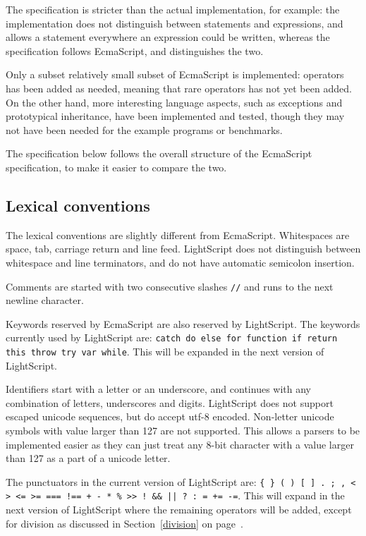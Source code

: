 \documentclass[11pt]{report}
\begin{document}
The specification is stricter than the actual implementation, for example: the implementation does not distinguish between statements and expressions, and allows a statement everywhere an expression could be written, whereas the specification follows EcmaScript, and distinguishes the two.

Only a subset relatively small subset of EcmaScript is implemented: operators has been added as needed, meaning that rare operators has not yet been added. 
On the other hand, more interesting language aspects, such as exceptions and prototypical inheritance, have been implemented and tested, though they may not have been needed for the example programs or benchmarks.

The specification below follows the overall structure of the EcmaScript specification, to make it easier to compare the two.


\subsection{Lexical conventions}
The lexical conventions are slightly different from EcmaScript. 
Whitespaces are space, tab, carriage return and line feed. 
LightScript does not distinguish between whitespace and line terminators, and do not have automatic semicolon insertion.

Comments are started with two consecutive slashes \verb|//| and runs to the next newline character.

Keywords reserved by EcmaScript are also reserved by LightScript. The keywords currently used by LightScript are: {\tt catch do else for function if return this throw try var while}. This will be expanded in the next version of LightScript.

Identifiers start with a letter or an underscore, and continues with any combination of letters, underscores and digits. 
LightScript does not support escaped unicode sequences, but do accept utf-8 encoded. Non-letter unicode symbols with value larger than 127 are not supported. This allows a parsers to be implemented easier as they can just treat any 8-bit character with a value larger than 127 as a part of a unicode letter.

The punctuators in the current version of LightScript are: {\tt \verb|{| \verb|}| ( ) [ ] . ; , < > <= >= === !== + - * \% >> ! \&\& || ? : = += -=}. 
This will expand in the next version of LightScript where the remaining operators will be added, except for division as discussed in Section~\ref{division} on page~\pageref{division}.
\end{document}
